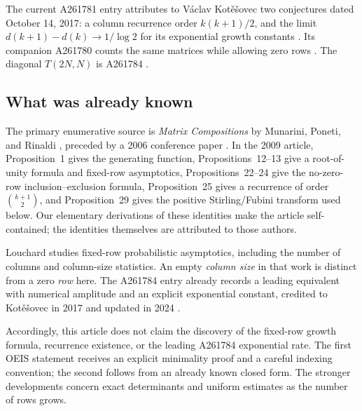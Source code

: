 \documentclass[11pt]{article}
\numberwithin{equation}{section}
\theoremstyle{definition}
\theoremstyle{remark}
\begin{document}
The current A261781 entry attributes to V\'aclav Kot\v{e}\v{s}ovec two
conjectures dated October 14, 2017: a column recurrence order
$k(k+1)/2$, and the limit $d(k+1)-d(k)\to1/\log 2$ for its exponential
growth constants \cite{oeis781}. Its companion A261780 counts the same
matrices while allowing zero rows \cite{oeis780}. The diagonal
$T(2N,N)$ is A261784 \cite{oeis784}.

\subsection{What was already known}
The primary enumerative source is \emph{Matrix Compositions} by Munarini,
Poneti, and Rinaldi \cite{mpr2009}, preceded by a 2006 conference paper
\cite{mpr2006}. In the 2009 article, Proposition~1 gives the generating
function, Propositions~12--13 give a root-of-unity formula and fixed-row
asymptotics, Propositions~22--24 give the no-zero-row inclusion--exclusion
formula, Proposition~25 gives a recurrence of order $\binom{k+1}{2}$,
and Proposition~29 gives the positive Stirling/Fubini transform used below.
Our elementary derivations of these identities make the article
self-contained; the identities themselves are attributed to those authors.

Louchard \cite{louchard} studies fixed-row probabilistic asymptotics,
including the number of columns and column-size statistics. An empty
\emph{column size} in that work is distinct from a zero \emph{row} here.
The A261784 entry already records a leading equivalent with numerical
amplitude and an explicit exponential constant, credited to
Kot\v{e}\v{s}ovec in 2017 and updated in 2024 \cite{oeis784}.

Accordingly, this article does not claim the discovery of the fixed-row
growth formula, recurrence existence, or the leading A261784 exponential
rate. The first OEIS statement receives an explicit minimality proof and a
careful indexing convention; the second follows from an already known
closed form. The stronger developments concern exact determinants and
uniform estimates as the number of rows grows.
\end{document}
